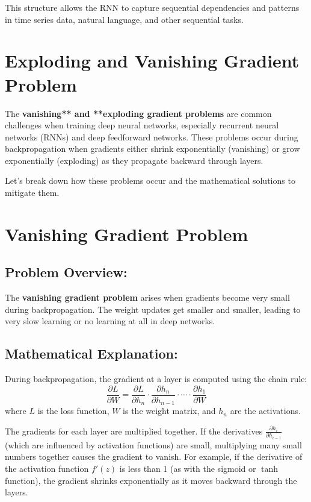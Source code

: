 \documentclass[10pt]{article}
\begin{document}
This structure allows the RNN to capture sequential dependencies and patterns in time series data, natural language, and other sequential tasks.


\section {Exploding and Vanishing Gradient Problem}


The {\bf vanishing** and **exploding gradient problems} are common challenges when training deep neural networks, especially recurrent neural networks (RNNs) and deep feedforward networks. These problems occur during backpropagation when gradients either shrink exponentially (vanishing) or grow exponentially (exploding) as they propagate backward through layers.

Let’s break down how these problems occur and the mathematical solutions to mitigate them.

\section{ Vanishing Gradient Problem}

\subsection{ Problem Overview:}
The {\bf vanishing gradient problem} arises when gradients become very small during backpropagation. The weight updates get smaller and smaller, leading to very slow learning or no learning at all in deep networks.

\subsection{ Mathematical Explanation:}
During backpropagation, the gradient at a layer is computed using the chain rule:
\[
\frac{\partial L}{\partial W} = \frac{\partial L}{\partial h_n} \cdot \frac{\partial h_n}{\partial h_{n-1}} \cdot \cdots \cdot \frac{\partial h_1}{\partial W}
\]
where \(L\) is the loss function, \(W\) is the weight matrix, and \(h_n\) are the activations.

The gradients for each layer are multiplied together. If the derivatives \( \frac{\partial h_i}{\partial h_{i-1}} \) (which are influenced by activation functions) are small, multiplying many small numbers together causes the gradient to vanish. For example, if the derivative of the activation function \( f'(z) \) is less than 1 (as with the sigmoid or \( \tanh \) function), the gradient shrinks exponentially as it moves backward through the layers.
\end{document}
